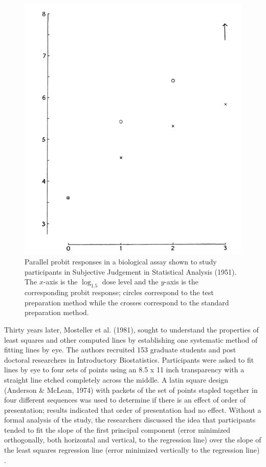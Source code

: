 \documentclass[print]{nuthesis}
\begin{document}
\begin{figure}[tbp]

{\centering \includegraphics[width=0.5\linewidth,]{images/02-you-draw-it/subjective-judgement-plot} 

}

\caption[Subjective Judgement in Statistical Analysis (1951) parallel probits]{Parallel probit responses in a biological assay shown to study participants in Subjective Judgement in Statistical Analysis (1951). The $x$-axis is the $\log_{1.5}$ dose level and the $y$-axis is the corresponding probit response; circles correspond to the test preparation method while the crosses correspond to the standard preparation method.}\label{fig:subjective-judgement}
\end{figure}

Thirty years later, Mosteller et al. (1981), sought to understand the properties of least squares and other computed lines by establishing one systematic method of fitting lines by eye.
The authors recruited 153 graduate students and post doctoral researchers in Introductory Biostatistics.
Participants were asked to fit lines by eye to four sets of points  using an 8.5 x 11 inch transparency with a straight line etched completely across the middle.
A latin square design (Anderson \& McLean, 1974) with packets of the set of points stapled together in four different sequences was used to determine if there is an effect of order of presentation; results indicated that order of presentation had no effect.
Without a formal analysis of the study, the researchers discussed the idea that participants tended to fit the slope of the first principal component (error minimized orthogonally, both horizontal and vertical, to the regression line) over the slope of the least squares regression line (error minimized vertically to the regression line) .
\end{document}
